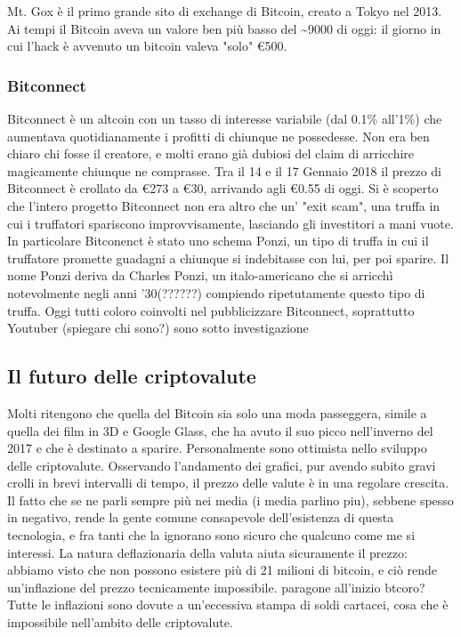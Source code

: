 \documentclass {article}
\begin{document}
{Mt. Gox è il primo grande sito di exchange di Bitcoin, creato a Tokyo nel 2013.
Ai tempi il Bitcoin aveva un valore ben più basso del \textasciitilde 9000 di oggi: il giorno in cui l'hack è avvenuto un bitcoin valeva "solo" \euro{500}.


\subsubsection {Bitconnect}


Bitconnect è un altcoin con un tasso di interesse variabile (dal 0.1\% all'1\%) che aumentava quotidianamente i profitti di chiunque ne possedesse.
Non era ben chiaro chi fosse il creatore, e molti erano già dubiosi del claim di arricchire magicamente chiunque ne comprasse.
Tra il 14 e il 17 Gennaio 2018 il prezzo di Bitconnect è crollato da \euro{273} a \euro{30}, arrivando agli \euro{0.55} di oggi. Si è scoperto che l'intero progetto Bitconnect non era altro che un' "exit scam", una truffa in cui i truffatori spariscono improvvisamente, lasciando gli investitori a mani vuote.
In particolare Bitconenct è stato uno schema Ponzi, un tipo di truffa in cui il truffatore promette guadagni a chiunque si indebitasse con lui, per poi sparire.
Il nome Ponzi deriva da Charles Ponzi, un italo-americano che si arricchì notevolmente negli anni '30(??????) compiendo ripetutamente questo tipo di truffa.
Oggi tutti coloro coinvolti nel pubblicizzare Bitconnect, soprattutto Youtuber (spiegare chi sono?) sono sotto investigazione


\subsection {Il futuro delle criptovalute}


Molti ritengono che quella del Bitcoin sia solo una moda passeggera, simile a quella dei film in 3D e Google Glass, che ha avuto il suo picco nell'inverno del 2017 e che è destinato a sparire.
Personalmente sono ottimista nello sviluppo delle criptovalute.
Osservando l'andamento dei grafici, pur avendo subito gravi crolli in brevi intervalli di tempo, il prezzo delle valute è in una regolare crescita.
Il fatto che se ne parli sempre più nei media (i media parlino piu), sebbene spesso in negativo, rende la gente comune consapevole dell'esistenza di questa tecnologia, e fra tanti che la ignorano sono sicuro che qualcuno come me si interessi.
La natura deflazionaria della valuta aiuta sicuramente il prezzo: abbiamo visto che non possono esistere più di 21 milioni di bitcoin, e ciò rende un'inflazione del prezzo tecnicamente impossibile. paragone all'inizio btcoro?
Tutte le inflazioni sono dovute a un'eccessiva stampa di soldi cartacei, cosa che è impossibile nell'ambito delle criptovalute.

}
\end{document}

